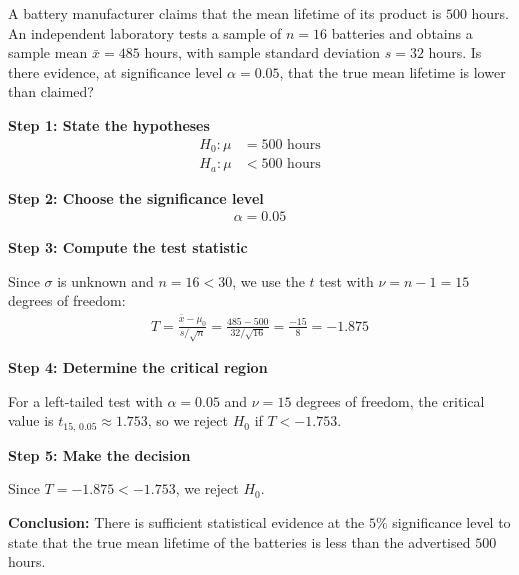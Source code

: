 \begin{ejemplo}
	\label{exmp:6.4.1}
	A battery manufacturer claims that the mean lifetime of its product is $500$ hours. An independent laboratory tests a sample of $n=16$ batteries and obtains a sample mean $\bar{x} = 485$ hours, with sample standard deviation $s = 32$ hours. Is there evidence, at significance level $\alpha = 0.05$, that the true mean lifetime is lower than claimed?
\end{ejemplo}

\begin{solucion}
	\textbf{Step 1: State the hypotheses}
	\begin{align}
		H_0: \mu &= 500 \text{ hours} \\
		H_a: \mu &< 500 \text{ hours}
	\end{align}

	\textbf{Step 2: Choose the significance level}
	\begin{align}
		\alpha = 0.05
	\end{align}

	\textbf{Step 3: Compute the test statistic}

	Since $\sigma$ is unknown and $n=16 < 30$, we use the $t$ test with $\nu = n-1 = 15$ degrees of freedom:
	\begin{align}
		T = \frac{\bar{x} - \mu_0}{s/\sqrt{n}} = \frac{485 - 500}{32/\sqrt{16}} = \frac{-15}{8} = -1.875
	\end{align}

	\textbf{Step 4: Determine the critical region}

	For a left-tailed test with $\alpha = 0.05$ and $\nu = 15$ degrees of freedom, the critical value is $t_{15,\,0.05} \approx 1.753$, so we reject $H_0$ if $T < -1.753$.

	\textbf{Step 5: Make the decision}

	Since $T = -1.875 < -1.753$, we reject $H_0$.

	\textbf{Conclusion:} There is sufficient statistical evidence at the $5\%$ significance level to state that the true mean lifetime of the batteries is less than the advertised $500$ hours.
\end{solucion}
